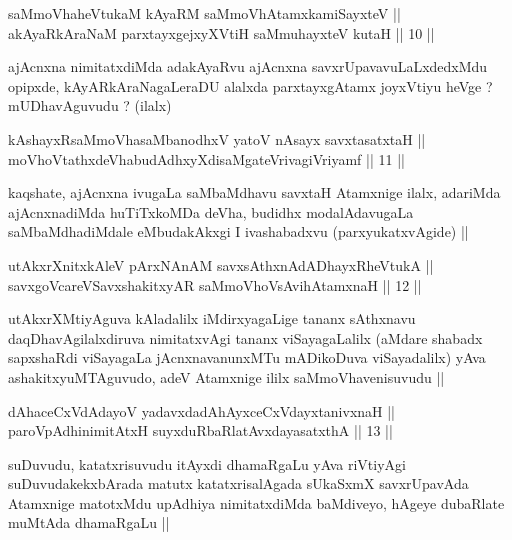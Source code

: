 
\begin{shl}
saMmoVhaheVtukaM kAyaRM saMmoVhAtamxkamiSayxteV ||  \\
akAyaRkAraNaM parxtayxgejxyXVtiH saMmuhayxteV kutaH ||  10 ||  
\end{shl}

\begin{artha}
ajAcnxna nimitatxdiMda adakAyaRvu ajAcnxna savxrUpavavuLaLxdedxMdu
opipxde, kAyARkAraNagaLeraDU alalxda parxtayxgAtamx joyxVtiyu heVge ?
mUDhavAguvudu ? (ilalx)
\end{artha}

\begin{shl}
kAshayxRsaMmoVhasaMbanodhxV yatoV nAsayx savxtasatxtaH || \\
moVhoVtathxdeVhabudAdhxyXdisaMgateVrivagiVriyamf ||  11 || 
\end{shl}

\begin{artha}
kaqshate, ajAcnxna ivugaLa saMbaMdhavu savxtaH Atamxnige ilalx,
adariMda ajAcnxnadiMda huTiTxkoMDa deVha, budidhx modalAdavugaLa
saMbaMdhadiMdale eMbudakAkxgi I ivashabadxvu (parxyukatxvAgide) ||
\end{artha}


\begin{shl}
utAkxrXnitxkAleV pArxNAnAM savxsAthxnAdADhayxRheVtukA || \\
savxgoVcareVSavxshakitxyAR saMmoVhoV\s sAvihA\s \s tamxnaH ||  12 ||  
\end{shl}

\begin{artha}
utAkxrXMtiyAguva kAladalilx iMdirxyagaLige tananx sAthxnavu
daqDhavAgilalxdiruva nimitatxvAgi tananx viSayagaLalilx (aMdare
shabadx sapxshaRdi viSayagaLa jAcnxnavanunxMTu mADikoDuva
viSayadalilx) yAva ashakitxyuMTAguvudo, adeV Atamxnige ililx
saMmoVhavenisuvudu ||
\end{artha}


\begin{shl}
dAhaceCxVdAdayoV yadavxdadAhAyxceCxVdayxtanivxnaH || \\
paroVpAdhinimitAtxH suyxduRbaRlatAvxdayasatxthA ||  13 ||  
\end{shl}

\begin{artha}
suDuvudu, katatxrisuvudu itAyxdi dhamaRgaLu yAva riVtiyAgi
suDuvudakekxbArada matutx katatxrisalAgada sUkaSxmX savxrUpavAda
Atamxnige matotxMdu upAdhiya nimitatxdiMda baMdiveyo, hAgeye dubaRlate
muMtAda dhamaRgaLu ||
\end{artha}

